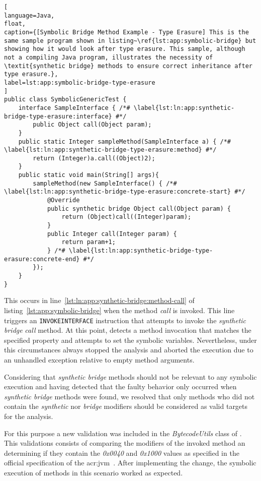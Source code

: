 \begin{lstlisting}[
language=Java,
float,
caption={[Symbolic Bridge Method Example - Type Erasure] This is the same sample program shown in listing~\ref{lst:app:symbolic-bridge} but showing how it would look after type erasure. This sample, although not a compiling Java program, illustrates the necessity of \textit{synthetic bridge} methods to ensure correct inheritance after type erasure.},
label=lst:app:symbolic-bridge-type-erasure
]
public class SymbolicGenericTest {
	interface SampleInterface { /*# \label{lst:ln:app:synthetic-bridge-type-erasure:interface} #*/
		public Object call(Object param); 
	}
	public static Integer sampleMethod(SampleInterface a) { /*# \label{lst:ln:app:synthetic-bridge-type-erasure:method} #*/
		return (Integer)a.call((Object)2);
	}
	public static void main(String[] args){
		sampleMethod(new SampleInterface() { /*# \label{lst:ln:app:synthetic-bridge-type-erasure:concrete-start} #*/
			@Override
			public synthetic bridge Object call(Object param) {
				return (Object)call((Integer)param);
			}
			public Integer call(Integer param) {				
				return param+1;
			} /*# \label{lst:ln:app:synthetic-bridge-type-erasure:concrete-end} #*/
		});
	}
}
\end{lstlisting}

This occurs in line~\ref{lst:ln:app:synthetic-bridge:method-call} of listing~\ref{lst:app:symbolic-bridge} when the method \textit{call} is invoked. This line triggers an \texttt{INVOKEINTERFACE} instruction that attempts to invoke the \textit{synthetic bridge} \textit{call} method. At this point, \spf{} detects a method invocation that matches the specified property and attempts to set the symbolic variables. Nevertheless, under this circumstances \spf{} always stopped the analysis and aborted the execution due to an unhandled exception relative to empty method arguments.

Considering that \textit{synthetic bridge} methods should not be relevant to any symbolic execution and having detected that the faulty behavior only occurred when \textit{synthetic bridge} methods were found, we resolved that only methods who did not contain the \textit{synthetic} nor \textit{bridge} modifiers should be considered as valid targets for the analysis.

For this purpose a new validation was included in the \textit{BytecodeUtils} class of \spf{}. This validations consists of comparing the modifiers of the invoked method an determining if they contain the \textit{0x0040} and \textit{0x1000} values as specified in the official specification of the \acrshort{acr:jvm}~\cite{Lindholm2014}. After implementing the change, the symbolic execution of methods in this scenario worked as expected. 

